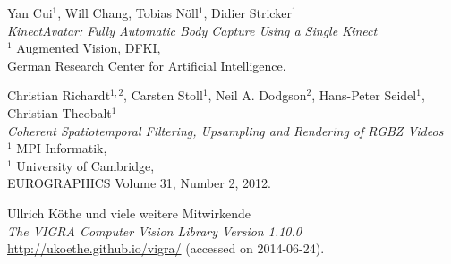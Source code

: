 \documentclass[12pt,a4paper,ngerman]{scrartcl}
\begin{document}
\begin{thebibliography}{99}
Yan Cui$^{1}$, Will Chang, Tobias Nöll$^{1}$, Didier Stricker$^{1}$\\
{\em KinectAvatar: Fully Automatic Body Capture Using a Single Kinect}\\
$^{1}$ Augmented Vision, DFKI,\\
German Research Center for Artificial Intelligence.

Christian Richardt$^{1,2}$, Carsten Stoll$^{1}$, Neil A. Dodgson$^{2}$, Hans-Peter Seidel$^{1}$, Christian Theobalt$^{1}$\\
{\em Coherent Spatiotemporal Filtering, Upsampling and Rendering of RGBZ Videos}\\
$^{1}$ MPI Informatik,\\
$^{1}$ University of Cambridge,\\
EUROGRAPHICS Volume 31, Number 2, 2012.

Ullrich Köthe und viele weitere Mitwirkende\\
{\em The VIGRA Computer Vision Library Version 1.10.0}\\
\url{http://ukoethe.github.io/vigra/} (accessed on 2014-06-24).

\end{thebibliography}
\end{document}
